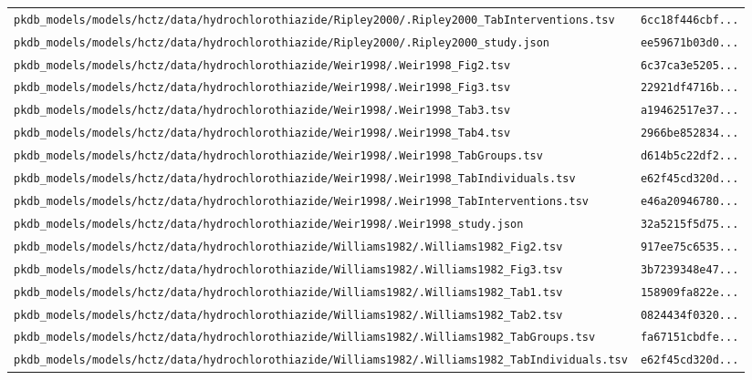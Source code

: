 \documentclass{article}
\begin{document}
\begin{longtable}{ll}
\texttt{pkdb\_models/models/hctz/data/hydrochlorothiazide/Ripley2000/.Ripley2000\_TabInterventions.tsv} & \texttt{6cc18f446cbf...} \\
\texttt{pkdb\_models/models/hctz/data/hydrochlorothiazide/Ripley2000/.Ripley2000\_study.json} & \texttt{ee59671b03d0...} \\
\texttt{pkdb\_models/models/hctz/data/hydrochlorothiazide/Weir1998/.Weir1998\_Fig2.tsv} & \texttt{6c37ca3e5205...} \\
\texttt{pkdb\_models/models/hctz/data/hydrochlorothiazide/Weir1998/.Weir1998\_Fig3.tsv} & \texttt{22921df4716b...} \\
\texttt{pkdb\_models/models/hctz/data/hydrochlorothiazide/Weir1998/.Weir1998\_Tab3.tsv} & \texttt{a19462517e37...} \\
\texttt{pkdb\_models/models/hctz/data/hydrochlorothiazide/Weir1998/.Weir1998\_Tab4.tsv} & \texttt{2966be852834...} \\
\texttt{pkdb\_models/models/hctz/data/hydrochlorothiazide/Weir1998/.Weir1998\_TabGroups.tsv} & \texttt{d614b5c22df2...} \\
\texttt{pkdb\_models/models/hctz/data/hydrochlorothiazide/Weir1998/.Weir1998\_TabIndividuals.tsv} & \texttt{e62f45cd320d...} \\
\texttt{pkdb\_models/models/hctz/data/hydrochlorothiazide/Weir1998/.Weir1998\_TabInterventions.tsv} & \texttt{e46a20946780...} \\
\texttt{pkdb\_models/models/hctz/data/hydrochlorothiazide/Weir1998/.Weir1998\_study.json} & \texttt{32a5215f5d75...} \\
\texttt{pkdb\_models/models/hctz/data/hydrochlorothiazide/Williams1982/.Williams1982\_Fig2.tsv} & \texttt{917ee75c6535...} \\
\texttt{pkdb\_models/models/hctz/data/hydrochlorothiazide/Williams1982/.Williams1982\_Fig3.tsv} & \texttt{3b7239348e47...} \\
\texttt{pkdb\_models/models/hctz/data/hydrochlorothiazide/Williams1982/.Williams1982\_Tab1.tsv} & \texttt{158909fa822e...} \\
\texttt{pkdb\_models/models/hctz/data/hydrochlorothiazide/Williams1982/.Williams1982\_Tab2.tsv} & \texttt{0824434f0320...} \\
\texttt{pkdb\_models/models/hctz/data/hydrochlorothiazide/Williams1982/.Williams1982\_TabGroups.tsv} & \texttt{fa67151cbdfe...} \\
\texttt{pkdb\_models/models/hctz/data/hydrochlorothiazide/Williams1982/.Williams1982\_TabIndividuals.tsv} & \texttt{e62f45cd320d...} \\

\end{longtable}
\end{document}
